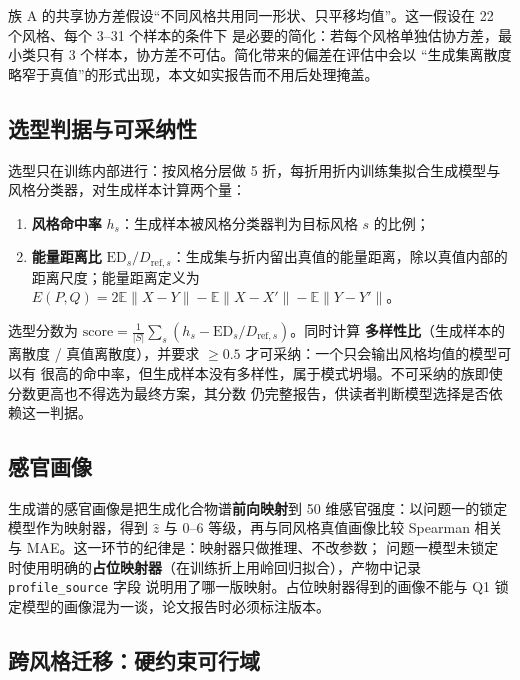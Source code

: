 \documentclass[
  a4paper,12pt]{article}
\providecommand{\tightlist}{%
  \setlength{\itemsep}{0pt}\setlength{\parskip}{0pt}}
\begin{document}
族 A 的共享协方差假设``不同风格共用同一形状、只平移均值''。这一假设在 22
个风格、每个 3--31 个样本的条件下
是必要的简化：若每个风格单独估协方差，最小类只有 3
个样本，协方差不可估。简化带来的偏差在评估中会以
``生成集离散度略窄于真值''的形式出现，本文如实报告而不用后处理掩盖。

\subsection{选型判据与可采纳性}\label{ux9009ux578bux5224ux636eux4e0eux53efux91c7ux7eb3ux6027}

选型只在训练内部进行：按风格分层做 5
折，每折用折内训练集拟合生成模型与风格分类器，对生成样本计算两个量：

\begin{enumerate}
\def\labelenumi{\arabic{enumi}.}
\tightlist
\item
  \textbf{风格命中率} \(h_s\)：生成样本被风格分类器判为目标风格 \(s\)
  的比例；
\item
  \textbf{能量距离比}
  \(\mathrm{ED}_s/D_{\text{ref},s}\)：生成集与折内留出真值的能量距离，除以真值内部的
  距离尺度；能量距离定义为
  \(E(P,Q)=2\mathbb{E}\|X-Y\|-\mathbb{E}\|X-X'\|-\mathbb{E}\|Y-Y'\|\)。
\end{enumerate}

选型分数为
\(\text{score}=\frac{1}{|S|}\sum_s\left(h_s-\mathrm{ED}_s/D_{\text{ref},s}\right)\)。同时计算
\textbf{多样性比}（生成样本的离散度 / 真值离散度），并要求 \(\ge0.5\)
才可采纳：一个只会输出风格均值的模型可以有
很高的命中率，但生成样本没有多样性，属于模式坍塌。不可采纳的族即使分数更高也不得选为最终方案，其分数
仍完整报告，供读者判断模型选择是否依赖这一判据。

\subsection{感官画像}\label{ux611fux5b98ux753bux50cf}

生成谱的感官画像是把生成化合物谱\textbf{前向映射}到 50
维感官强度：以问题一的锁定模型作为映射器，得到 \(\hat z\) 与 0--6
等级，再与同风格真值画像比较 Spearman 相关与
MAE。这一环节的纪律是：映射器只做推理、不改参数；
问题一模型未锁定时使用明确的\textbf{占位映射器}（在训练折上用岭回归拟合），产物中记录
\texttt{profile\_source} 字段
说明用了哪一版映射。占位映射器得到的画像不能与 Q1
锁定模型的画像混为一谈，论文报告时必须标注版本。

\subsection{跨风格迁移：硬约束可行域}\label{ux8de8ux98ceux683cux8fc1ux79fbux786cux7ea6ux675fux53efux884cux57df}
\end{document}
